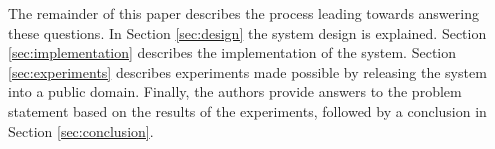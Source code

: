 The remainder of this paper describes the process leading towards answering these questions. In Section \ref{sec:design} the system design is explained. Section \ref{sec:implementation} describes the implementation of the system. Section \ref{sec:experiments} describes experiments made possible by releasing the system into a public domain. Finally, the authors provide answers to the problem statement based on the results of the experiments, followed by a conclusion in Section \ref{sec:conclusion}.


